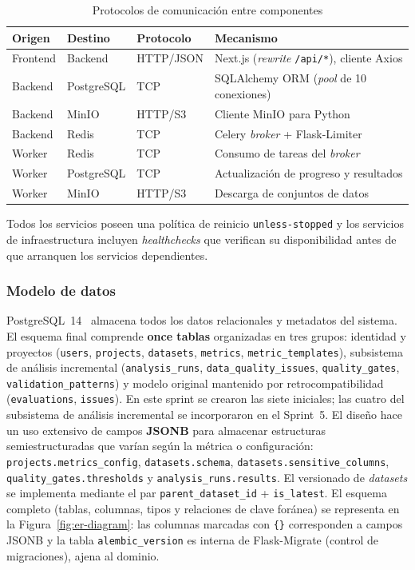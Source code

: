 \begin{table}[htbp]
  \centering
  \caption{Protocolos de comunicación entre componentes}
  \label{tab:comunicacion}
  \begin{tabularx}{\textwidth}{l l l X}
    \toprule
    \textbf{Origen} & \textbf{Destino} & \textbf{Protocolo} &
      \textbf{Mecanismo} \\
    \midrule
    Frontend & Backend    & HTTP/JSON & Next.js (\emph{rewrite} \texttt{/api/*}),
      cliente Axios \\
    Backend  & PostgreSQL & TCP       & SQLAlchemy \ac{ORM} (\emph{pool} de
      10 conexiones) \\
    Backend  & MinIO      & HTTP/S3   & Cliente MinIO para Python \\
    Backend  & Redis      & TCP       & Celery \emph{broker} + Flask-Limiter \\
    Worker   & Redis      & TCP       & Consumo de tareas del \emph{broker} \\
    Worker   & PostgreSQL & TCP       & Actualización de progreso y resultados \\
    Worker   & MinIO      & HTTP/S3   & Descarga de conjuntos de datos \\
    \bottomrule
  \end{tabularx}
\end{table}

Todos los servicios poseen una política de reinicio \texttt{unless-stopped}
y los servicios de infraestructura incluyen \emph{healthchecks} que verifican
su disponibilidad antes de que arranquen los servicios dependientes.

\subsubsection{Modelo de datos}
\label{sec:modelo-datos}

PostgreSQL~14~\citep{postgresql} almacena todos los datos relacionales y
metadatos del sistema.  El esquema final comprende \textbf{once tablas}
organizadas en tres grupos: identidad y proyectos (\texttt{users},
\texttt{projects}, \texttt{datasets}, \texttt{metrics},
\texttt{metric\_templates}), subsistema de análisis incremental
(\texttt{analysis\_runs}, \texttt{data\_quality\_issues},
\texttt{quality\_gates}, \texttt{validation\_patterns}) y modelo original
mantenido por retrocompatibilidad (\texttt{evaluations},
\texttt{issues}).  En este sprint se crearon las siete iniciales; las
cuatro del subsistema de análisis incremental se incorporaron en el Sprint~5.  El
diseño hace un uso extensivo de campos \textbf{JSONB} para almacenar
estructuras semiestructuradas que varían según la métrica o
configuración: \texttt{projects.metrics\_config},
\texttt{datasets.schema}, \texttt{datasets.sensitive\_columns},
\texttt{quality\_gates.thresholds} y \texttt{analysis\_runs.results}.
El versionado de \emph{datasets} se implementa mediante el par
\texttt{parent\_dataset\_id} + \texttt{is\_latest}.  El esquema
completo (tablas, columnas, tipos y relaciones de clave foránea) se
representa en la Figura~\ref{fig:er-diagram}: las columnas marcadas con
\texttt{\{\}} corresponden a campos JSONB y la tabla
\texttt{alembic\_version} es interna de Flask-Migrate (control de
migraciones), ajena al dominio.

